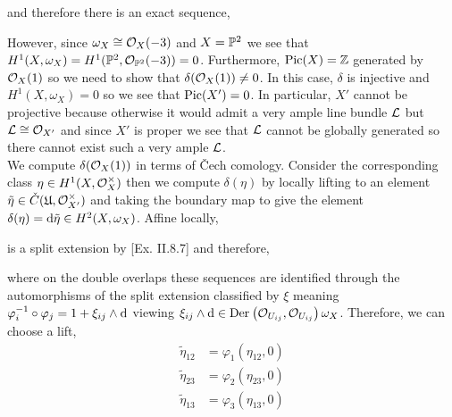 \documentclass[12pt]{article}
\begin{document}
and therefore there is an exact sequence,
\begin{center}
\end{center}
However, since $\omega_X \cong \struct{X}(-3)$ and $X = \P^2$ we see that $H^1(X, \omega_X) = H^1(\P^2, \struct{\P^2}(-3)) = 0$. Furthermore, $\Pic{X} = \Z$ generated by $\struct{X}(1)$ so we need to show that $\delta(\struct{X}(1)) \neq 0$. In this case, $\delta$ is injective and $H^1(X, \omega_X) = 0$ so we see that $\Pic{X'} = 0$. In particular, $X'$ cannot be projective because otherwise it would admit a very ample line bundle $\L$ but $\L \cong \struct{X'}$ and since $X'$ is proper we see that $\L$ cannot be globally generated so there cannot exist such a very ample $\L$.
\bigskip\\
We compute $\delta(\struct{X}(1))$ in terms of \v{C}ech comology. Consider the corresponding class $\eta \in H^1(X, \struct{X}^\times)$ then we compute $\delta(\eta)$ by locally lifting to an element $\tilde{\eta} \in \check{C}(\U, \struct{X'}^\times)$ and taking the boundary map to give the element $\delta(\eta) = \d{\tilde{\eta}} \in H^2(X, \omega_X)$. Affine locally,
\begin{center}
\end{center}
is a split extension by [Ex. II.8.7] and therefore,
\begin{center}
\end{center}
where on the double overlaps these sequences are identified through the automorphisms of the split extension classified by $\xi$ meaning $\varphi_i^{-1} \circ \varphi_j = 1 + \xi_{ij} \wedge \d$ viewing $\xi_{ij} \wedge \d \in \Der{\struct{U_{ij}}}{\struct{U_{ij}}}{\omega_X}$.
Therefore, we can choose a lift, 
\begin{align*}
\tilde{\eta}_{12} & = \varphi_1(\eta_{12}, 0)
\\
\tilde{\eta}_{23} & = \varphi_2(\eta_{23}, 0)
\\
\tilde{\eta}_{13} & = \varphi_3(\eta_{13}, 0)
\end{align*}
\end{document}
